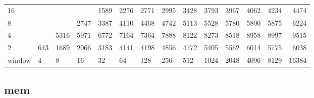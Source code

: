 \begin{table}[]
{\begin{tabular}{lrrrrrrrrrrrrr}
			\multicolumn{1}{|l|}{16} &  &  &  & \cellcolor[HTML]{E69900}1589 & \cellcolor[HTML]{E69900}2276 & \cellcolor[HTML]{E60000}2771 & \cellcolor[HTML]{E60000}2995 & \cellcolor[HTML]{E60000}3428 & \cellcolor[HTML]{9900E6}3793 & \cellcolor[HTML]{9900E6}3967 & \cellcolor[HTML]{9900E6}4062 & \cellcolor[HTML]{9900E6}4234 & \cellcolor[HTML]{9900E6}4474 \\ \cline{1-1}
			\multicolumn{1}{|l|}{8} &  &  & \cellcolor[HTML]{E60000}2747 & \cellcolor[HTML]{E60000}3387 & \cellcolor[HTML]{9900E6}4110 & \cellcolor[HTML]{9900E6}4468 & \cellcolor[HTML]{9900E6}4742 & \cellcolor[HTML]{4C00E6}5113 & \cellcolor[HTML]{4C00E6}5528 & \cellcolor[HTML]{4C00E6}5780 & \cellcolor[HTML]{4C00E6}5800 & \cellcolor[HTML]{4C00E6}5875 & \cellcolor[HTML]{4C00E6}6224 \\ \cline{1-1}
			\multicolumn{1}{|l|}{4} &  & \cellcolor[HTML]{4C00E6}5316 & \cellcolor[HTML]{4C00E6}5971 & \cellcolor[HTML]{4C00E6}6772 & \cellcolor[HTML]{4C00E6}7164 & \cellcolor[HTML]{4C00E6}7364 & \cellcolor[HTML]{4C00E6}7888 & \cellcolor[HTML]{4C00E6}8122 & \cellcolor[HTML]{4C00E6}8273 & \cellcolor[HTML]{4C00E6}8518 & \cellcolor[HTML]{4C00E6}8958 & \cellcolor[HTML]{4C00E6}8997 & \cellcolor[HTML]{4C00E6}9515 \\ \cline{1-1}
			\multicolumn{1}{|l|}{2} & \cellcolor[HTML]{99E600}643 & \cellcolor[HTML]{E69900}1689 & \cellcolor[HTML]{E60000}2066 & \cellcolor[HTML]{E60000}3183 & \cellcolor[HTML]{9900E6}4141 & \cellcolor[HTML]{9900E6}4198 & \cellcolor[HTML]{9900E6}4856 & \cellcolor[HTML]{9900E6}4772 & \cellcolor[HTML]{4C00E6}5405 & \cellcolor[HTML]{4C00E6}5562 & \cellcolor[HTML]{4C00E6}6014 & \cellcolor[HTML]{4C00E6}5775 & \cellcolor[HTML]{4C00E6}6038 \\ \cline{1-1} \cline{11-14} 
			\multicolumn{1}{l|}{window} & \multicolumn{1}{l|}{4} & \multicolumn{1}{l|}{8} & \multicolumn{1}{l|}{16} & \multicolumn{1}{l|}{32} & \multicolumn{1}{l|}{64} & \multicolumn{1}{l|}{128} & \multicolumn{1}{l|}{256} & \multicolumn{1}{l|}{512} & \multicolumn{1}{l|}{1024} & \multicolumn{1}{l|}{2048} & \multicolumn{1}{l|}{4096} & \multicolumn{1}{l|}{8129} & \multicolumn{1}{l|}{16384} \\ \cline{2-14} 
		\end{tabular}
	}
\end{table}





\subsection{mem}



